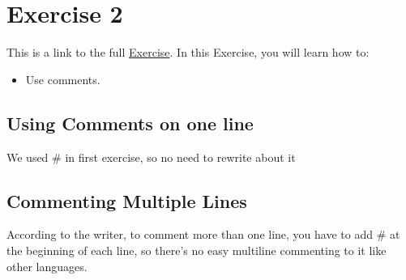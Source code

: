 \section*{Exercise 2}

This is a link to the full \href{https://github.com/alla1101/-PythonHardWay-/blob/master/E02/ex2.py}{Exercise}. 
In this Exercise, you will learn how to:
\begin{itemize}
    \item Use comments.
\end{itemize}

\subsection*{Using Comments on one line}

We used # in first exercise, so no need to rewrite about it

\subsection*{Commenting Multiple Lines}

According to the writer, to comment more than one line, you have to add # at the beginning of each line, so there's no easy multiline commenting to it like other languages.
